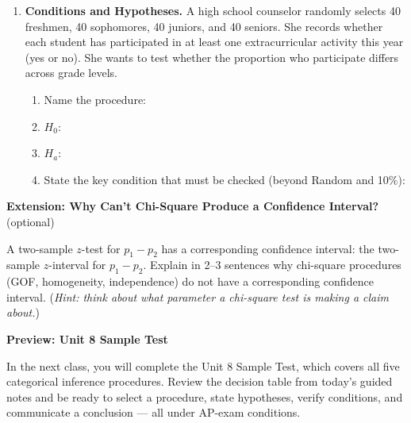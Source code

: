 \documentclass[10pt]{article}
\begin{document}
\begin{enumerate}
\begin{enumerate}[label=\alph*.]
        \item A classmate argues that a two-sample $z$-test for $p_1 - p_2$ should be used
              because there are only two groups. Identify the error in this reasoning.
              \writeline \writeline

        \item Write $H_0$ for the correct procedure.
              $H_0$: \writeline
      \end{enumerate}

\vspace{0.10in}

\item \textbf{Conditions and Hypotheses.} \;
      A high school counselor randomly selects 40 freshmen, 40 sophomores, 40 juniors, and
      40 seniors. She records whether each student has participated in at least one extracurricular
      activity this year (yes or no). She wants to test whether the proportion who participate
      differs across grade levels.

      \begin{enumerate}[label=\alph*.]
        \item Name the procedure: \blank{9cm}
        \item $H_0$: \writeline
        \item $H_a$: \writeline
        \item State the key condition that must be checked (beyond Random and 10\%): \writeline
      \end{enumerate}

\end{enumerate}

\begin{extensionbox}
\textbf{Extension: Why Can't Chi-Square Produce a Confidence Interval?} (optional)

A two-sample $z$-test for $p_1 - p_2$ has a corresponding confidence interval: the two-sample
$z$-interval for $p_1 - p_2$. Explain in 2--3 sentences why chi-square procedures (GOF,
homogeneity, independence) do not have a corresponding confidence interval. (\textit{Hint:
think about what parameter a chi-square test is making a claim about.})
\end{extensionbox}

\begin{reflectionbox}
\textbf{Preview: Unit 8 Sample Test}

In the next class, you will complete the Unit 8 Sample Test, which covers all five categorical
inference procedures. Review the decision table from today's guided notes and be ready to select
a procedure, state hypotheses, verify conditions, and communicate a conclusion --- all under
AP-exam conditions.
\end{reflectionbox}
\end{document}
